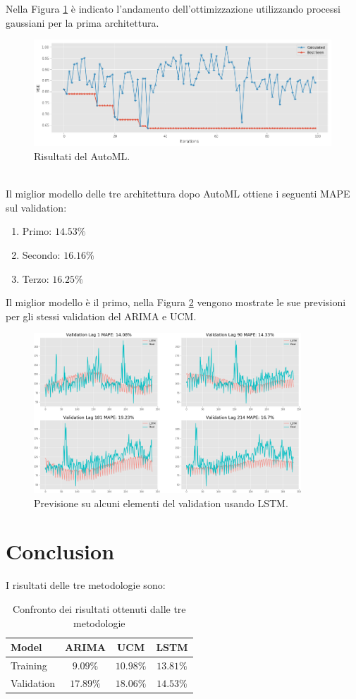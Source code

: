 \documentclass[12pt, onecolumn]{article}
\begin{document}
Nella Figura \ref{fig:automl} è indicato l'andamento dell'ottimizzazione utilizzando processi gaussiani per la prima architettura.
\begin{figure}[!h]
  \centering
  \includegraphics[width=\linewidth,height=4cm]{imgs/automl_1.png}
  \caption{Risultati del AutoML.}
  \label{fig:automl}
\end{figure}\\
Il miglior modello delle tre architettura dopo AutoML ottiene i seguenti MAPE sul validation:
\begin{enumerate}[noitemsep, topsep=0ex]
\item Primo: $14.53\%$
\item Secondo: $16.16\%$
\item Terzo: $16.25\%$
\end{enumerate}
Il miglior modello è il primo, nella Figura \ref{fig:LSTM_pred} vengono mostrate le sue previsioni per gli stessi validation del ARIMA e UCM.
\begin{figure}[!h]
  \centering
  \includegraphics[width=\linewidth,height=6cm]{imgs/forecast_lstm.png}
  \caption{Previsione su alcuni elementi del validation usando LSTM.}
  \label{fig:LSTM_pred}
\end{figure}
\section*{Conclusion}
I risultati delle tre metodologie sono:

\begin{table}[!h]
  \centering
  \begin{tabular}{|l|c|c|c|}
    \hline
    Model & ARIMA & UCM & LSTM\\
    \hline
    Training & $9.09\%$ & $10.98\%$ & $13.81\%$\\
    Validation & $17.89\%$ & $18.06\%$ & $14.53\%$\\
    \hline
  \end{tabular}
  \caption{Confronto dei risultati ottenuti dalle tre metodologie }
  \label{tab:confronto}
\end{table}
\end{document}

